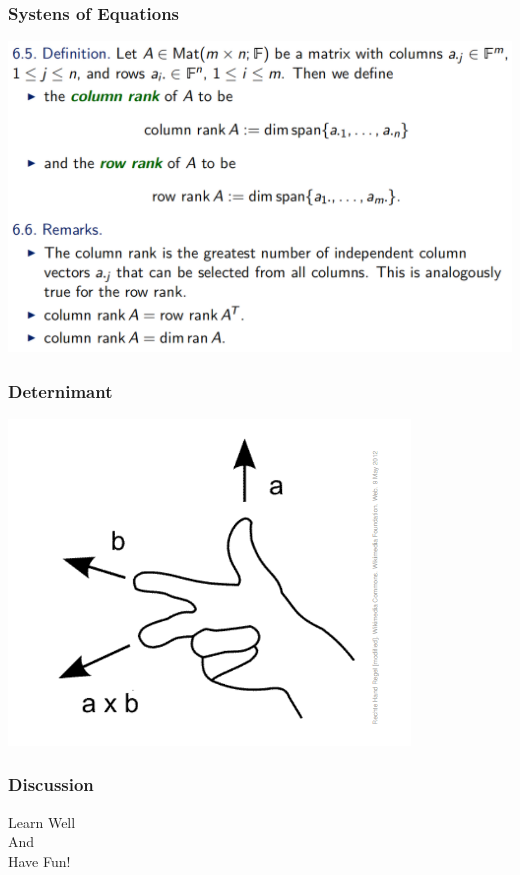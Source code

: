 \documentclass[12pt, t]{beamer}
\begin{document}
\begin{frame}
    \frametitle{Systens of Equations}
    \begin{center}
        \includegraphics[width=\textwidth]{6}
    \end{center}
\end{frame}


\begin{frame}
    \frametitle{Deternimant}
    \begin{center}
        \includegraphics[width=0.8\textwidth]{8}
    \end{center}
\end{frame}


\begin{frame}
    \frametitle{Discussion}
    \vspace{1.5cm}
    \Large
    \centering
    Learn Well\\
    And\\
    Have Fun!\\


\end{frame}
\end{document}
